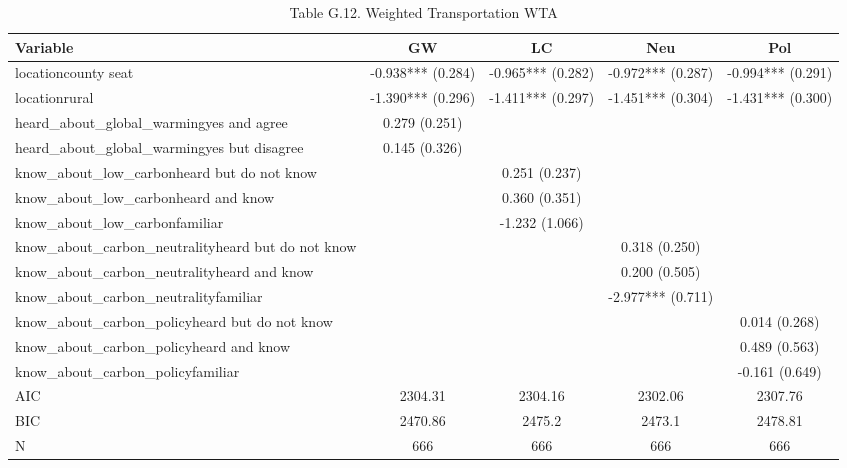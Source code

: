 \begin{table}[!htbp]
\centering
\caption{Table G.12. Weighted Transportation WTA}
\begin{tabular}{lcccc}
\hline
Variable & GW & LC & Neu & Pol \\
\hline
locationcounty seat & -0.938*** (0.284) & -0.965*** (0.282) & -0.972*** (0.287) & -0.994*** (0.291) \\
locationrural & -1.390*** (0.296) & -1.411*** (0.297) & -1.451*** (0.304) & -1.431*** (0.300) \\
heard\_about\_global\_warmingyes and agree & 0.279 (0.251) &  &  &  \\
heard\_about\_global\_warmingyes but disagree & 0.145 (0.326) &  &  &  \\
know\_about\_low\_carbonheard but do not know &  & 0.251 (0.237) &  &  \\
know\_about\_low\_carbonheard and know &  & 0.360 (0.351) &  &  \\
know\_about\_low\_carbonfamiliar &  & -1.232 (1.066) &  &  \\
know\_about\_carbon\_neutralityheard but do not know &  &  & 0.318 (0.250) &  \\
know\_about\_carbon\_neutralityheard and know &  &  & 0.200 (0.505) &  \\
know\_about\_carbon\_neutralityfamiliar &  &  & -2.977*** (0.711) &  \\
know\_about\_carbon\_policyheard but do not know &  &  &  & 0.014 (0.268) \\
know\_about\_carbon\_policyheard and know &  &  &  & 0.489 (0.563) \\
know\_about\_carbon\_policyfamiliar &  &  &  & -0.161 (0.649) \\
AIC & 2304.31 & 2304.16 & 2302.06 & 2307.76 \\
BIC & 2470.86 & 2475.2 & 2473.1 & 2478.81 \\
N & 666 & 666 & 666 & 666 \\
\hline
\end{tabular}
\end{table}

